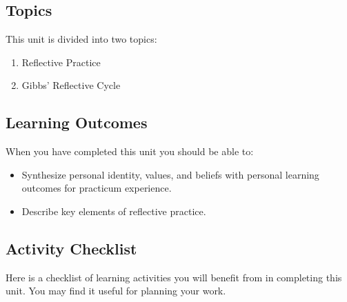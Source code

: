 \documentclass[
]{book}
\providecommand{\tightlist}{%
  \setlength{\itemsep}{0pt}\setlength{\parskip}{0pt}}
\begin{document}
\hypertarget{topics-1}{%
\subsection*{Topics}\label{topics-1}}

This unit is divided into two topics:

\begin{enumerate}
\def\labelenumi{\arabic{enumi}.}
\tightlist
\item
  Reflective Practice\\
\item
  Gibbs' Reflective Cycle
\end{enumerate}

\hypertarget{learning-outcomes-2}{%
\subsection*{Learning Outcomes}\label{learning-outcomes-2}}

When you have completed this unit you should be able to:

\begin{itemize}
\item
  Synthesize personal identity, values, and beliefs with personal learning outcomes for practicum experience.
\item
  Describe key elements of reflective practice.
\end{itemize}

\hypertarget{activity-checklist-1}{%
\subsection*{Activity Checklist}\label{activity-checklist-1}}

Here is a checklist of learning activities you will benefit from in completing this unit. You may find it useful for planning your work.
\end{document}
